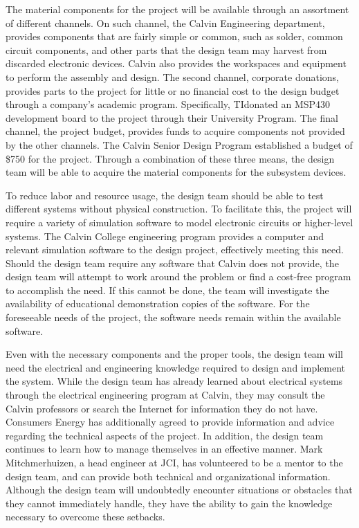 The material components for the project will be available through an assortment of different channels. On such channel, the Calvin Engineering department, provides components that are fairly simple or common, such as solder, common circuit components, and other parts that the design team may harvest from discarded electronic devices. Calvin also provides the workspaces and equipment to perform the assembly and design. The second channel, corporate donations, provides parts to the project for little or no financial cost to the design budget through a company's academic program. Specifically, \acl{TI}donated an MSP430 development board to the project through their University Program. The final channel, the project budget, provides funds to acquire components not provided by the other channels. The Calvin Senior Design Program established a budget of \$750 for the project. Through a combination of these three means, the design team will be able to acquire the material components for the subsystem devices.

To reduce labor and resource usage, the design team should be able to test different systems without physical construction. To facilitate this, the project will require a variety of simulation software to model electronic circuits or higher-level systems. The Calvin College engineering program provides a computer and relevant simulation software to the design project, effectively meeting this need. Should the design team require any software that Calvin does not provide, the design team will attempt to work around the problem or find a cost-free program to accomplish the need. If this cannot be done, the team will investigate the availability of educational demonstration copies of the software. For the foreseeable needs of the project, the software needs remain within the available software.

Even with the necessary components and the proper tools, the design team will need the electrical and engineering knowledge required to design and implement the system. While the design team has already learned about electrical systems through the electrical engineering program at Calvin, they may consult the Calvin professors or search the Internet for information they do not have. Consumers Energy has additionally agreed to provide information and advice regarding the technical aspects of the project. In addition, the design team continues to learn how to manage themselves in an effective manner. Mark Mitchmerhuizen, a head engineer at \ac{JCI}, has volunteered to be a mentor to the design team, and can provide both technical and organizational information. Although the design team will undoubtedly encounter situations or obstacles that they cannot immediately handle, they have the ability to gain the knowledge necessary to overcome these setbacks.

